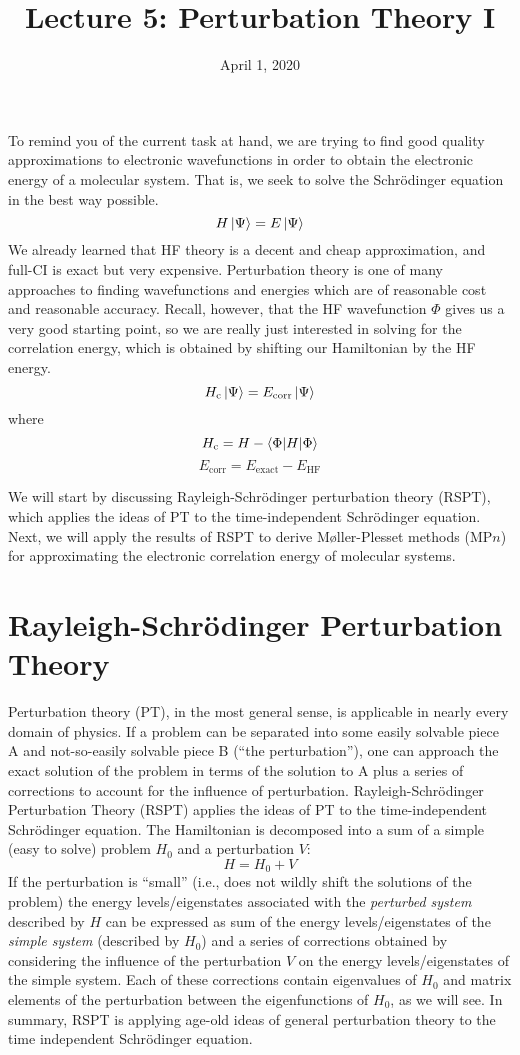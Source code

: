 \documentclass{article}
\title{Lecture 5: Perturbation Theory I}
\date{April 1, 2020}
\newcommand{\Ecorr}{E_{\mathrm{corr}}}
\newcommand{\Hc}{H_{\mathrm{c}}}
\begin{document}
\maketitle
\noindent
To remind you of the current task at hand, we are trying to find good quality approximations 
    to electronic wavefunctions in order to obtain the electronic energy of a molecular system. 
That is, we seek to solve the Schr{\"o}dinger equation in the best way possible.
\[H \ket{\Psi} = E \ket{\Psi} \]
We already learned that HF theory is a decent and cheap approximation, and full-CI is exact but very expensive. 
Perturbation theory is one of many approaches to finding wavefunctions and energies which are of 
    reasonable cost and reasonable accuracy.
Recall, however, that the HF wavefunction $\Phi$ gives us a very good starting point, so we are really just interested in solving for the correlation energy,
which is obtained by shifting our Hamiltonian by the HF energy.
\[\Hc \ket{\Psi} = \Ecorr \ket{\Psi} \]
where 
\[\Hc = H - \braket{\Phi| H | \Phi} \]
\[\Ecorr = E_{\mathrm{exact}} - E_{\mathrm{HF}}\]

We will start by discussing Rayleigh-Schr{\"o}dinger perturbation theory (RSPT), which applies the ideas of PT to the time-independent 
    Schr{\"o}dinger equation.
Next, we will apply the results of RSPT to derive M{\o}ller-Plesset methods (MP$n$) for approximating the electronic correlation energy of molecular systems. 

\section{Rayleigh-Schr{\"o}dinger Perturbation Theory}
Perturbation theory (PT), in the most general sense, is applicable in nearly every domain of physics. 
If a problem can be separated into some easily solvable piece A and not-so-easily solvable piece B 
    (``the perturbation''), one can approach the exact solution of the problem in terms of the solution to A 
    plus a series of corrections to account for the influence of perturbation.
Rayleigh-Schr{\"o}dinger Perturbation Theory (RSPT) applies the ideas of PT to the time-independent 
    Schr{\"o}dinger equation.
The Hamiltonian is decomposed into a sum of a simple (easy to solve) problem $H_0$ and a perturbation $V$:
\[H = H_0 + V \]
If the perturbation is ``small'' (i.e., does not wildly shift the solutions of the problem) the 
    energy levels/eigenstates associated with the \textit{perturbed system} described by $H$ can be expressed 
    as sum of the energy levels/eigenstates of  the \textit{simple system} (described by $H_0$) and a series 
    of corrections obtained by considering the influence of the perturbation $V$ on the 
    energy levels/eigenstates of the simple system.
Each of these corrections contain eigenvalues of $H_0$ and matrix elements of the perturbation 
    between the eigenfunctions of $H_0$, as we will see.
In summary, RSPT is applying age-old ideas of general perturbation theory to the
    time independent Schr{\"o}dinger equation.
\end{document}
